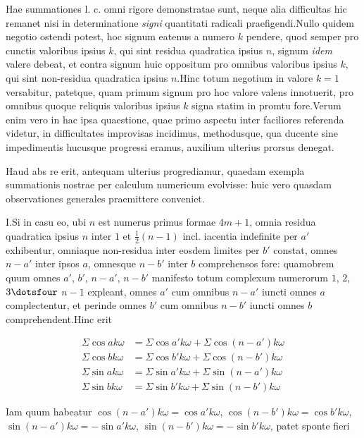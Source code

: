 Hae summationes l. c. omni rigore demonstratae sunt, neque alia difficultas hic remanet nisi in determinatione \emph{signi} quantitati radicali praefigendi.\quad Nullo quidem negotio ostendi potest, hoc signum eatenus a numero $k$ pendere, quod semper pro cunctis valoribus ipsius $k$, qui sint residua quadratica ipsius $n$, signum \emph{idem} valere debeat, et contra signum huic oppositum pro omnibus valoribus ipsius $k$, qui sint non-residua quadratica ipsius $n$.\quad Hinc totum negotium in valore $k=1$ versabitur, patetque, quam primum signum pro hoc valore valens innotuerit, pro omnibus quoque reliquis valoribus ipsius $k$ signa statim in promtu fore.\quad Verum enim vero in hac ipsa quaestione, quae primo aspectu inter faciliores referenda videtur, in difficultates improvisas incidimus, methodusque, qua ducente sine impedimentis hucusque progressi eramus, auxilium ulterius prorsus denegat.


Haud abs re erit, antequam ulterius progrediamur, quaedam exempla summationis nostrae per calculum numericum evolvisse: huic vero quasdam observationes generales praemittere conveniet.

I.\quad Si in casu eo, ubi $n$ est numerus primus formae $4m+1$, omnia residua quadratica ipsius $n$ inter $1$ et $\frac12(n-1)$ incl. iacentia indefinite per $a'$ exhibentur, omniaque non-residua inter eosdem limites per $b'$ constat, omnes $n-a'$ inter ipsos $a$, omnesque $n-b'$ inter $b$ comprehensos fore: quamobrem quum omnes $a'$, $b'$, $n-a'$, $n-b'$ manifesto totum complexum numerorum $1$, $2$, $3\dotsfour$ $n-1$ expleant, omnes $a'$ cum omnibus $n-a'$ iuncti omnes $a$ complectentur, et perinde omnes $b'$ cum omnibus $n-b'$ iuncti omnes $b$ comprehendent.\quad Hinc erit

\[
\begin{aligned}
\Sigma\cos ak\omega&=\Sigma\cos a'k\omega+\Sigma\cos(n-a')k\omega\\
\Sigma\cos bk\omega&=\Sigma\cos b'k\omega+\Sigma\cos(n-b')k\omega\\
\Sigma\sin ak\omega&=\Sigma\sin a'k\omega+\Sigma\sin(n-a')k\omega\\
\Sigma\sin bk\omega&=\Sigma\sin b'k\omega+\Sigma\sin(n-b')k\omega
\end{aligned}
\]

Iam quum habeatur $\cos(n-a')k\omega=\cos a'k\omega$, $\cos(n-b')k\omega=\cos b'k\omega$, $\sin(n-a')k\omega=-\sin a'k\omega$, $\sin(n-b')k\omega=-\sin b'k\omega$, patet sponte fieri

